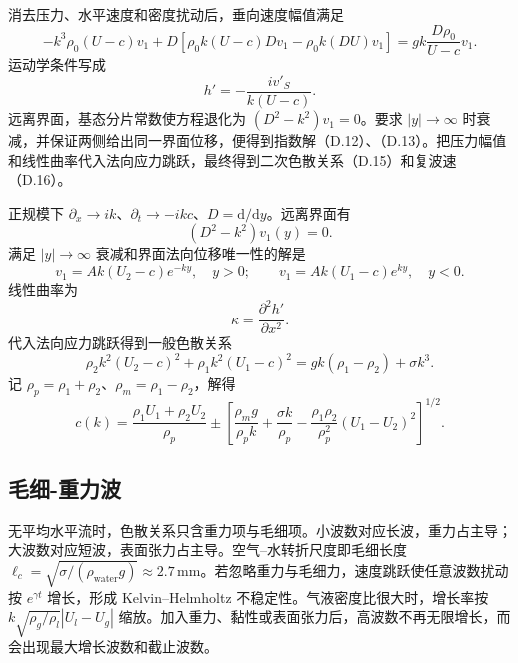 \documentclass[11pt,a4paper,openany,fontset=none]{ctexbook}
\begin{document}
消去压力、水平速度和密度扰动后，垂向速度幅值满足
\begin{equation}
 -k^3\rho_0(U-c)v_1+D[\rho_0k(U-c)Dv_1-\rho_0k(DU)v_1]
 =gk\frac{D\rho_0}{U-c}v_1. \tag{D.9}
\end{equation}
运动学条件写成
\begin{equation}
 h'=-\frac{i v'_S}{k(U-c)}. \tag{D.10}
\end{equation}
远离界面，基态分片常数使方程退化为 $(D^2-k^2)v_1=0$。要求 $|y|\to\infty$ 时衰减，并保证两侧给出同一界面位移，便得到指数解（D.12）、（D.13）。把压力幅值和线性曲率代入法向应力跳跃，最终得到二次色散关系（D.15）和复波速（D.16）。

正规模下 $\partial_x\to ik$、$\partial_t\to-ikc$、$D=\mathrm d/\mathrm dy$。远离界面有
\begin{equation}
 (D^2-k^2)v_1(y)=0. \tag{D.11}
\end{equation}
满足 $|y|\to\infty$ 衰减和界面法向位移唯一性的解是
\begin{equation}
 v_1=A k(U_2-c)e^{-ky},\quad y>0;\qquad
 v_1=A k(U_1-c)e^{ky},\quad y<0. \tag{D.12--D.13}
\end{equation}
线性曲率为
\begin{equation}
 \kappa=\frac{\partial^2h'}{\partial x^2}. \tag{D.14}
\end{equation}
代入法向应力跳跃得到一般色散关系
\begin{equation}
 \rho_2k^2(U_2-c)^2+\rho_1k^2(U_1-c)^2
 =gk(\rho_1-\rho_2)+\sigma k^3. \tag{D.15}
\end{equation}
记 $\rho_p=\rho_1+\rho_2$、$\rho_m=\rho_1-\rho_2$，解得
\begin{equation}
 c(k)=\frac{\rho_1U_1+\rho_2U_2}{\rho_p}
 \pm\left[
 \frac{\rho_mg}{\rho_pk}+\frac{\sigma k}{\rho_p}
 -\frac{\rho_1\rho_2}{\rho_p^2}(U_1-U_2)^2
 \right]^{1/2}. \tag{D.16}
\end{equation}

\subsection{毛细-重力波}
无平均水平流时，色散关系只含重力项与毛细项。小波数对应长波，重力占主导；大波数对应短波，表面张力占主导。空气--水转折尺度即毛细长度 $\ell_c=\sqrt{\sigma/(\rho_{\mathrm{water}}g)}\approx2.7\,\mathrm{mm}$。若忽略重力与毛细力，速度跳跃使任意波数扰动按 $e^{\gamma t}$ 增长，形成 Kelvin--Helmholtz 不稳定性。气液密度比很大时，增长率按 $k\sqrt{\rho_g/\rho_l}|U_l-U_g|$ 缩放。加入重力、黏性或表面张力后，高波数不再无限增长，而会出现最大增长波数和截止波数。
\end{document}
